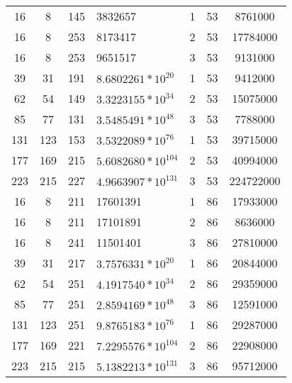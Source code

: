 \documentclass[a4paper,11pt]{article}
\begin{document}
\begin{table}[h]
\begin{tabular}{ |c|c|c|p{3cm}|c|c|c| }
      16 & 8 & 145 & 3832657 & 1 & 53 & 8761000 \\
      16 & 8 & 253 & 8173417 & 2 & 53 & 17784000 \\
      16 & 8 & 253 & 9651517 & 3 & 53 & 9131000 \\
      39 & 31 & 191 & \begin{math} 8.6802261 \ast 10^{20} \end{math} & 1 & 53 & 9412000 \\
      62 & 54 & 149 & \begin{math} 3.3223155 \ast 10^{34} \end{math} & 2 & 53 & 15075000 \\
      85 & 77 & 131 & \begin{math} 3.5485491 \ast 10^{48} \end{math} & 3 & 53 & 7788000 \\
      131 & 123 & 153 & \begin{math} 3.5322089 \ast 10^{76} \end{math} & 1 & 53 & 39715000 \\
      177 & 169 & 215 & \begin{math} 5.6082680 \ast 10^{104} \end{math} & 2 & 53 & 40994000 \\
      223 & 215 & 227 & \begin{math} 4.9663907 \ast 10^{131} \end{math} & 3 & 53 & 224722000 \\
      16 & 8 & 211 & 17601391 & 1 & 86 & 17933000 \\
      16 & 8 & 211 & 17101891 & 2 & 86 & 8636000 \\
      16 & 8 & 241 & 11501401 & 3 & 86 & 27810000 \\
      39 & 31 & 217 & \begin{math} 3.7576331 \ast 10^{20} \end{math} & 1 & 86 & 20844000 \\
      62 & 54 & 251 & \begin{math} 4.1917540 \ast 10^{34} \end{math} & 2 & 86 & 29359000 \\
      85 & 77 & 251 & \begin{math} 2.8594169 \ast 10^{48} \end{math} & 3 & 86 & 12591000 \\
      131 & 123 & 251 & \begin{math} 9.8765183 \ast 10^{76} \end{math} & 1 & 86 & 29287000 \\
      177 & 169 & 221 & \begin{math} 7.2295576 \ast 10^{104} \end{math} & 2 & 86 & 22908000 \\
      223 & 215 & 215 & \begin{math} 5.1382213 \ast 10^{131} \end{math} & 3 & 86 & 95712000 \\


\end{tabular}
\end{table}
\end{document}
